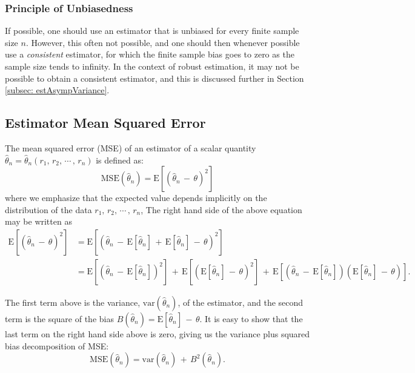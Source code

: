 \documentclass[graybox,envcountchap,sectrefs]{svmono}\usepackage[]{graphicx}\usepackage[]{xcolor}
\begin{document}
\begin{appendices}
\subsubsection*{Principle of Unbiasedness}

If possible, one should use an estimator that is unbiased for every
finite sample size $n$. However, this often not possible, and one
should then whenever possible use a \emph{consistent} estimator, for
which the finite sample bias goes to zero as the sample size tends
to infinity. In the context of robust estimation, it may not be possible
to obtain a consistent estimator, and this is discussed further in
Section \ref{subsec: estAsympVariance}.

\subsection{Estimator Mean Squared Error\label{subsec: estMSE}}

The mean squared error (MSE) of an estimator of a scalar quantity
$\hat{\theta}_{n}=\hat{\theta}_{n}(r_{1},\,r_{2},\,\cdots\,,\,r_{n})$
is defined as:
\begin{equation}
\mathrm{MSE}\left(\hat{\theta}_{n}\right)=\mathrm{E}\left[\left(\hat{\theta}_{n}\,-\,\theta\right)^{2}\right]\label{eq:MSEscalar}
\end{equation}
where we emphasize that the expected value depends implicitly on the
distribution of the data $r_{1},\,r_{2},\,\cdots\,,\,r_{n}$, The
right hand side of the above equation may be written as
\begin{align}
\mathrm{E}\left[\left(\hat{\theta}_{n}\,-\,\theta\right)^{2}\right] & =\mathrm{E}\left[\left(\hat{\theta}_{n}\,-\,\mathrm{E}\left[\hat{\theta}_{n}\right]\,+\,\mathrm{E}\left[\hat{\theta}_{n}\right]\,-\,\theta\right)^{2}\right]\nonumber \\
 & =\mathrm{E}\left[\left(\hat{\theta}_{n}\,-\,\mathrm{E}\left[\hat{\theta}_{n}\right]\right)^{2}\right]\,+\,\mathrm{E}\left[\left(\mathrm{E}\left[\hat{\theta}_{n}\right]\,-\,\theta\right)^{2}\right]\,+\,\mathrm{E}\left[\left(\hat{\theta}_{n}\,-\,\mathrm{E}\left[\hat{\theta}_{n}\right]\right)\left(\mathrm{E}\left[\hat{\theta}_{n}\right]\,-\,\theta\right)\right].\label{eq:MSEexpanded}
\end{align}

The first term above is the variance, $\mathrm{var}\left(\hat{\theta}_{n}\right)$,
of the estimator, and the second term is the square of the bias $B\left(\hat{\theta}_{n}\right)=\mathrm{E}\left[\hat{\theta}_{n}\right]\,-\,\theta$.
It is easy to show that the last term on the right hand side above
is zero, giving us the variance plus squared bias decomposition of
MSE:
\begin{equation}
\mathrm{MSE}\left(\hat{\theta}_{n}\right)=\mathrm{var}\left(\hat{\theta}_{n}\right)\,+\,B^{2}\left(\hat{\theta}_{n}\right).\label{eq: mseDecomposition}
\end{equation}


\end{appendices}
\end{document}
